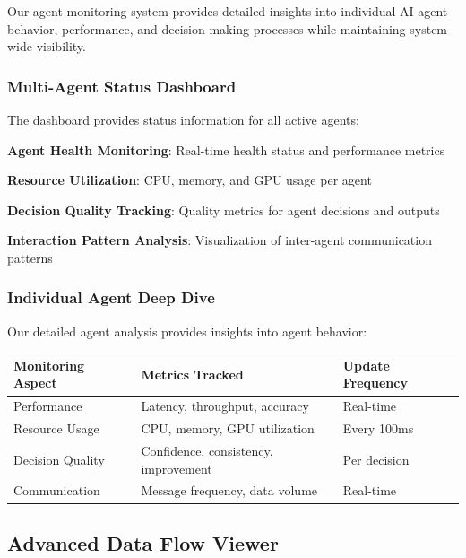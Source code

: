 Our agent monitoring system provides detailed insights into individual AI agent behavior, performance, and decision-making processes while maintaining system-wide visibility.

\subsubsection*{Multi-Agent Status Dashboard}

The dashboard provides status information for all active agents:

\begin{expandedlist}
    \item \textbf{Agent Health Monitoring}: Real-time health status and performance metrics
    \item \textbf{Resource Utilization}: CPU, memory, and GPU usage per agent
    \item \textbf{Decision Quality Tracking}: Quality metrics for agent decisions and outputs
    \item \textbf{Interaction Pattern Analysis}: Visualization of inter-agent communication patterns
\end{expandedlist}

\subsubsection*{Individual Agent Deep Dive}

Our detailed agent analysis provides insights into agent behavior:

\begin{center}
\begin{tabular}{@{}lll@{}}
\toprule
\textbf{Monitoring Aspect} & \textbf{Metrics Tracked} & \textbf{Update Frequency} \\
\midrule
Performance & Latency, throughput, accuracy & Real-time \\
Resource Usage & CPU, memory, GPU utilization & Every 100ms \\
Decision Quality & Confidence, consistency, improvement & Per decision \\
Communication & Message frequency, data volume & Real-time \\
\bottomrule
\end{tabular}
\end{center}

\subsection*{Advanced Data Flow Viewer}

